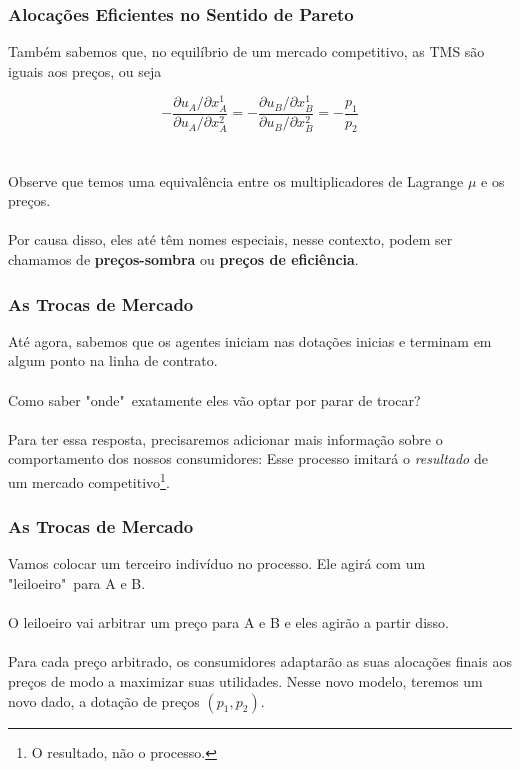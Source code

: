 \documentclass{beamer}[10]
\begin{document}
\begin{frame}
	\frametitle{Alocações Eficientes no Sentido de Pareto}

	Também sabemos que, no equilíbrio de um mercado competitivo, as TMS são iguais aos preços, ou seja

	$$ - \frac{\partial u_A / \partial x_{A}^1 }{\partial u_A / \partial x_{A}^2} = - \frac{\partial u_B / \partial x_{B}^1 }{\partial u_B / \partial x_{B}^2} = - \frac{ p_{1} }{ p_{2} } $$
	\\~\\
	Observe que temos uma equivalência entre os multiplicadores de Lagrange $\mu$ e os preços. 
	\\~\\
	Por causa disso, eles até têm nomes especiais, nesse contexto, podem ser chamamos de \textbf{preços-sombra} ou \textbf{preços de eficiência}.

\end{frame}

\begin{frame}
	\frametitle{As Trocas de Mercado}

	Até agora, sabemos que os agentes iniciam nas dotações inicias e terminam em algum ponto na linha de contrato.
	\\~\\
	Como saber "onde"\ exatamente eles vão optar por parar de trocar?
	\\~\\
	Para ter essa resposta, precisaremos adicionar mais informação sobre o comportamento dos nossos consumidores: Esse processo imitará o \textit{resultado} de um mercado competitivo\footnote{O resultado, não o processo.}.

\end{frame}

\begin{frame}
	\frametitle{As Trocas de Mercado}

	Vamos colocar um terceiro indivíduo no processo. Ele agirá com um "leiloeiro"\ para A e B.
	\\~\\
	O leiloeiro vai arbitrar um preço para A e B e eles agirão a partir disso. 
	\\~\\
	Para cada preço arbitrado, os consumidores adaptarão as suas alocações finais aos preços de modo a maximizar suas utilidades. Nesse novo modelo, teremos  um novo dado, a dotação de preços $(p_1,p_2)$.

\end{frame}
\end{document}
